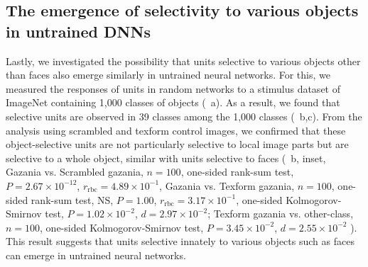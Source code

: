 \documentclass[final,3p,times,twocolumn]{elsarticle}
\begin{document}
\subsection{The emergence of selectivity to various objects in untrained DNNs}
Lastly, we investigated the possibility that units selective to various objects other than faces also emerge similarly in untrained neural networks.
For this, we measured the responses of units in random networks to a stimulus dataset of ImageNet containing 1,000 classes of objects (~a).
As a result, we found that selective units are observed in 39 classes among the 1,000 classes (~b,c).
From the analysis using scrambled and texform control images, we confirmed that these object-selective units are not particularly selective to local image parts but are selective to a whole object, similar with units selective to faces
(~b, inset,
Gazania vs. Scrambled gazania, 
$ n=100 $,
one-sided rank-sum test,
$ P = 2.67 \times 10^{-12} $,
$ r_\textrm{rbc} = 4.89 \times 10^{-1} $,
%
Gazania vs. Texform gazania, 
$ n = 100 $,
one-sided rank-sum test, NS,
$ P = 1.00 $,
$ r_\textrm{rbc} = 3.17 \times 10^{-1} $,
one-sided Kolmogorov-Smirnov test,
$ P = 1.02 \times 10^{-2} $,
$ d = 2.97 \times 10^{-2} $;
% 
Texform gazania vs. other-class,
$ n = 100 $,
one-sided Kolmogorov-Smirnov test,
$ P = 3.45 \times 10^{-2} $,
$ d = 2.55 \times 10^{-2} $
).
This result suggests that units selective innately to various objects such as faces can emerge in untrained neural networks.
\end{document}
